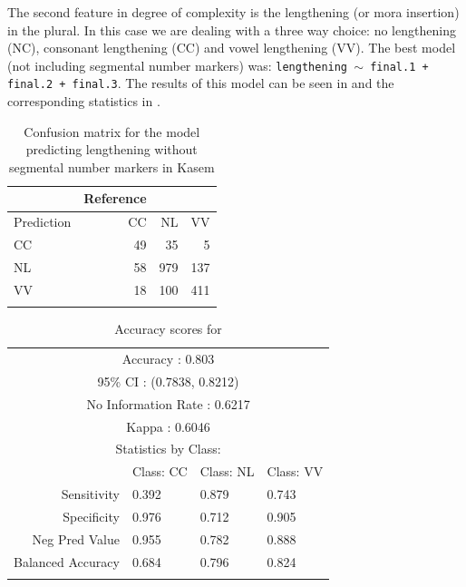 The second feature in degree of complexity is the lengthening (or mora insertion) in the plural. In this case we are dealing with a three way choice: no lengthening (NC), consonant lengthening (CC) and vowel lengthening (VV). The best model (not including segmental number markers) was: \texttt{lengthening $\sim$ final.1 + final.2 + final.3}. The results of this model can be seen in  and the corresponding statistics in .

\begin{table}[t]
  \centering
  \begin{tabular}{lrrr}
    \lsptoprule
    &          Reference\\
    \midrule
    Prediction  &CC  &NL  &VV\\
    CC  &49  &35   &5\\
    NL  &58 &979 &137\\
    VV  &18 &100 &411\\
    \lspbottomrule
  \end{tabular}
    \caption{Confusion matrix for the model predicting lengthening without segmental number markers in Kasem}
  \label{tab:length-kasem-1}
\end{table}

\begin{table}[p]
  \centering\small
  \begin{tabular}{rlll}
    \lsptoprule
    \multicolumn{4}{c}{Overall Statistics}                \\
    \midrule
    \multicolumn{4}{c}{Accuracy : 0.803}                  \\
    \multicolumn{4}{c}{95\% CI : (0.7838, 0.8212)}        \\
    \multicolumn{4}{c}{No Information Rate : 0.6217}      \\
    \multicolumn{4}{c}{Kappa : 0.6046}                    \\
    \midrule
    \multicolumn{4}{c}{Statistics by Class:}              \\
    \midrule
                      & Class: CC & Class: NL & Class: VV \\
    Sensitivity       & 0.392     & 0.879     & 0.743     \\
    Specificity       & 0.976     & 0.712     & 0.905     \\
    Neg Pred Value    & 0.955     & 0.782     & 0.888     \\
    Balanced Accuracy & 0.684     & 0.796     & 0.824     \\
    \lspbottomrule
  \end{tabular}
  \caption{Accuracy scores for }\label{tab:length-kasem-1-stats}
\end{table}

